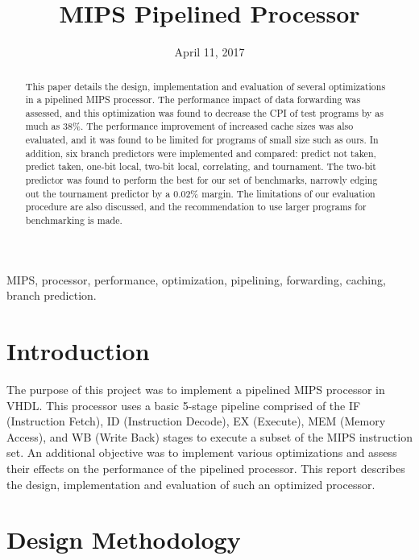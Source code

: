 \documentclass[conference, hidelinks]{IEEEtran}
\title{MIPS Pipelined Processor}
\author{
  \IEEEauthorblockN{Andrei Purcarus} \IEEEauthorblockA{260631911}
  \and
  \IEEEauthorblockN{Vladislav Gulevich} \IEEEauthorblockA{260636748}
  \and
  \IEEEauthorblockN{Sebastian Pilarski} \IEEEauthorblockA{260622030}
  \and
  \IEEEauthorblockN{Carlos Bosco} \IEEEauthorblockA{260569326}
}
\date{April 11, 2017}
\begin{document}
\sloppy

\maketitle
\thispagestyle{plain}
\pagestyle{plain}

\begin{abstract}

This paper details the design, implementation and evaluation of several optimizations in a pipelined MIPS processor. The performance impact of data forwarding was assessed, and this optimization was found to decrease the CPI of test programs by as much as 38\%. The performance improvement of increased cache sizes was also evaluated, and it was found to be limited for programs of small size such as ours. In addition, six branch predictors were implemented and compared: predict not taken, predict taken, one-bit local, two-bit local, correlating, and tournament. The two-bit predictor was found to perform the best for our set of benchmarks, narrowly edging out the tournament predictor by a 0.02\% margin. The limitations of our evaluation procedure are also discussed, and the recommendation to use larger programs for benchmarking is made.

\end{abstract}

\begin{IEEEkeywords}

MIPS, processor, performance, optimization, pipelining, forwarding, caching, branch prediction.

\end{IEEEkeywords}

\section{Introduction}

The purpose of this project was to implement a pipelined MIPS processor in VHDL. This processor uses a basic 5-stage pipeline comprised of the IF (Instruction Fetch), ID (Instruction Decode), EX (Execute), MEM (Memory Access), and WB (Write Back) stages to execute a subset of the MIPS instruction set. An additional objective was to implement various optimizations and assess their effects on the performance of the pipelined processor. This report describes the design, implementation and evaluation of such an optimized processor.

\section{Design Methodology}
\end{document}

